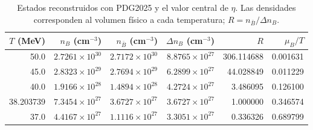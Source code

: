 \begin{table}[t]\centering\small
\caption{Estados reconstruidos con PDG2025 y el valor central de $\eta$. Las densidades corresponden al volumen físico a cada temperatura; $R=n_{\bar B}/\Delta n_B$.}
\label{tab:states}
\setlength{\tabcolsep}{6pt}
\begin{tabular}{rrrrrr}\toprule
$T$ (MeV) & $n_B$ (cm$^{-3}$) & $n_{\bar B}$ (cm$^{-3}$) & $\Delta n_B$ (cm$^{-3}$) & $R$ & $\mu_B/T$\\\midrule
50.0 & $2.7261\times10^{30}$ & $2.7172\times10^{30}$ & $8.8765\times10^{27}$ & 306.114688 & 0.001631\\
45.0 & $2.8323\times10^{29}$ & $2.7694\times10^{29}$ & $6.2899\times10^{27}$ & 44.028849 & 0.011229\\
40.0 & $1.9166\times10^{28}$ & $1.4894\times10^{28}$ & $4.2724\times10^{27}$ & 3.486095 & 0.126100\\
38.203739 & $7.3454\times10^{27}$ & $3.6727\times10^{27}$ & $3.6727\times10^{27}$ & 1.000000 & 0.346574\\
37.0 & $4.4167\times10^{27}$ & $1.1116\times10^{27}$ & $3.3051\times10^{27}$ & 0.336326 & 0.689799\\
\bottomrule\end{tabular}
\end{table}
